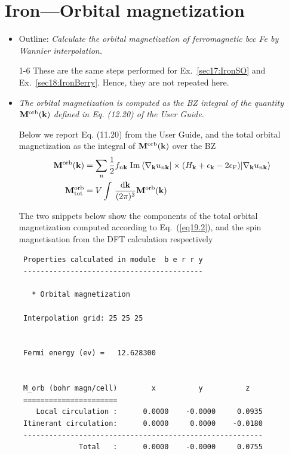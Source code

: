 \section{Iron---Orbital magnetization}
\label{sec19:IronOM}

\begin{itemize}
	\item Outline: {\it Calculate the orbital magnetization of ferromagnetic bcc Fe by Wannier interpolation.}
\end{itemize}

\begin{itemize}
	\item[1-6] These are the same steps performed for Ex.~\ref{sec17:IronSO} and Ex.~\ref{sec18:IronBerry}. Hence, they are not repeated here.

	\item {\it The orbital magnetization is computed as the BZ integral of the quantity $\mathbf{M}^{\mathrm{orb}}(\bfk)$ defined in Eq. (12.20)
of the User Guide.}

Below we report Eq. (11.20) from the User Guide, and the total orbital magnetization as the integral of $\mathbf{M}^{\mathrm{orb}}(\bfk)$ over the BZ
\begin{align}
\mathbf{M}^{\mathrm{orb}}(\bfk) & = \sum_{n}\frac{1}{2}f_{n\bfk}\;\mathrm{Im} \braket{\nabla_{\bfk}\unk \vert \times (H_\bfk + \epsilon_\bfk - 2\epsilon_{\mathrm{F}}) \vert \nabla_\bfk \unk}
\label{eq19.1} \\
\mathbf{M}^{\mathrm{orb}}_{\mathrm{tot}} & = V\int\,\frac{\diffk}{(2\pi)^3} \mathbf{M}^{\mathrm{orb}}(\bfk)
\label{eq19.2}
\end{align}

The two snippets below show the components of the total orbital magnetization computed according to Eq.~(\ref{eq19.2}), and the spin magnetisation from the DFT calculation respectively  
{\small
\begin{tcolorbox}[title=From Fe.wpout,sharp corners,boxrule=0.5pt]
\begin{verbatim}
 Properties calculated in module  b e r r y
 ------------------------------------------

   * Orbital magnetization
  
 Interpolation grid: 25 25 25


 Fermi energy (ev) =   12.628300


 M_orb (bohr magn/cell)        x          y          z
 ======================
    Local circulation :      0.0000    -0.0000     0.0935
 Itinerant circulation:      0.0000     0.0000    -0.0180
 --------------------------------------------------------
              Total   :      0.0000    -0.0000     0.0755


\end{verbatim}
\end{tcolorbox}}
\end{itemize}
